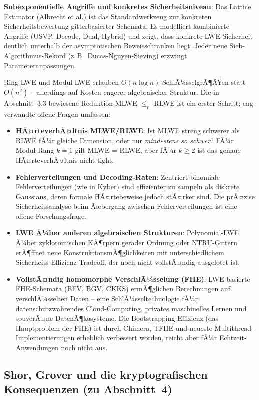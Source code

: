 ﻿\documentclass[a4paper,12pt]{article}
\theoremstyle{definition}
\begin{document}
\textbf{Subexponentielle Angriffe und konkretes Sicherheitsniveau}:
Das Lattice Estimator (Albrecht et al.) ist das Standardwerkzeug zur
konkreten Sicherheitsbewertung gitterbasierter Schemata. Es modelliert
kombinierte Angriffe (USVP, Decode, Dual, Hybrid) und zeigt, dass
konkrete LWE-Sicherheit deutlich unterhalb der asymptotischen
Beweisschranken liegt. Jeder neue Sieb-Algorithmus-Rekord
(z.\,B.\ Ducas-Nguyen-Sieving) erzwingt Parameteranpassungen.

Ring-LWE und Modul-LWE erlauben $O(n \log n)$-SchlÃ¼sselgrÃ¶ÃŸen
statt $O(n^2)$ -- allerdings auf Kosten engerer algebraischer Struktur.
Die in Abschnitt~3.3 bewiesene Reduktion MLWE $\leq_p$ RLWE ist ein
erster Schritt; eng verwandte offene Fragen umfassen:

\begin{itemize}
  \item \textbf{HÃ¤rteverhÃ¤ltnis MLWE/RLWE}: Ist MLWE streng schwerer
    als RLWE fÃ¼r gleiche Dimension, oder nur \emph{mindestens so schwer}?
    FÃ¼r Modul-Rang $k=1$ gilt MLWE = RLWE, aber fÃ¼r $k \geq 2$ ist
    das genaue HÃ¤rteverhÃ¤ltnis nicht tight.
  \item \textbf{Fehlerverteilungen und Decoding-Raten}: Zentriert-binomiale
    Fehlerverteilungen (wie in Kyber) sind effizienter zu sampeln als
    diskrete Gaussians, deren formale HÃ¤rtebeweise jedoch stÃ¤rker sind.
    Die prÃ¤zise Sicherheitsanalyse beim Ãœbergang zwischen
    Fehlerverteilungen ist eine offene Forschungsfrage.
  \item \textbf{LWE Ã¼ber anderen algebraischen Strukturen}: Polynomial-LWE
    Ã¼ber zyklotomischen KÃ¶rpern gerader Ordnung oder NTRU-Gittern
    erÃ¶ffnet neue KonstruktionsmÃ¶glichkeiten mit unterschiedlichem
    Sicherheits-Effizienz-Tradeoff, der noch nicht vollstÃ¤ndig
    ausgelotet ist.
  \item \textbf{VollstÃ¤ndig homomorphe VerschlÃ¼sselung (FHE)}: LWE-basierte
    FHE-Schemata (BFV, BGV, CKKS) ermÃ¶glichen Berechnungen auf
    verschlÃ¼sselten Daten -- eine SchlÃ¼sseltechnologie fÃ¼r
    datenschutzwahrendes Cloud-Computing, privates maschinelles Lernen
    und souverÃ¤ne DatenÃ¶kosysteme. Die Bootstrapping-Effizienz (das
    Hauptproblem der FHE) ist durch Chimera, TFHE und neueste
    Multithread-Implementierungen erheblich verbessert worden,
    reicht aber fÃ¼r Echtzeit-Anwendungen noch nicht aus.
\end{itemize}

\subsection{Shor, Grover und die kryptografischen Konsequenzen (zu Abschnitt~4)}
\end{document}
